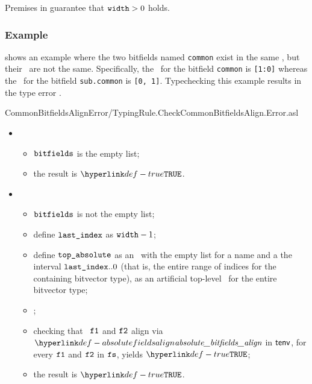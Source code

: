 Premises in  guarantee that $\texttt{width} > 0$ holds.

\subsubsection{Example}
 shows an example where the two bitfields named \texttt{common}
exist in the same \bitfieldscope, but their \absoluteslices\ are not the same.
Specifically, the \absoluteslice\ for the bitfield \texttt{common} is \texttt{[1:0]}
whereas the \absoluteslice\ for the bitfield \texttt{sub.common} is \texttt{[0, 1]}.
Typechecking this example results in the type error \BadSlices.

{CommonBitfieldsAlignError}{\typingtests/TypingRule.CheckCommonBitfieldsAlign.Error.asl}

\ProseParagraph
\OneApplies
\begin{itemize}
  \item {}
  \begin{itemize}
    \item $\vbitfields$ is the empty list;
    \item the result is $\True$.
  \end{itemize}

  \item {}
  \begin{itemize}
    \item $\vbitfields$ is not the empty list;
    \item define $\texttt{last\_index}$ as $\texttt{width} - 1$;
    \item define $\vtopabsolute$ as an \absolutebitfield\ with the empty list
          for a name and a the interval $\texttt{last\_index}..0$ (that is, the entire range
          of indices for the containing bitvector type),
          as an artificial top-level \absolutebitfield\ for the entire bitvector type;
    \item \Prosebitfieldstoabsolute{$\tenv$}{$\vbitfields$}{$\vtopabsolute$}{$\vfs$};
    \item checking that \absolutebitfields\ $\texttt{f1}$ and $\texttt{f2}$ align via
          $\absolutebitfieldsalign$ in $\tenv$, for every $\texttt{f1}$ and $\texttt{f2}$ in $\vfs$,
          yields $\True$\ProseTerminateAs{\BadSlices};
    \item the result is $\True$.
  \end{itemize}
\end{itemize}

